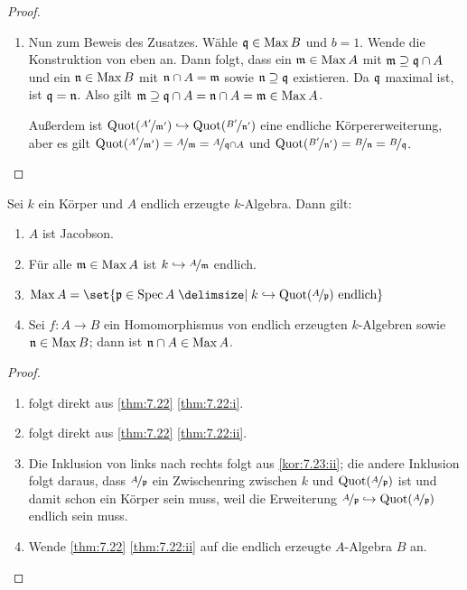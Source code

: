 \documentclass[12pt,a4paper]{scrartcl}
\theoremstyle{cplain}
\theoremstyle{cdef}
\begin{document}
\begin{proof}
\begin{enumerate}[label=\ref{thm:7.22:\roman*}]

		\item Nun zum Beweis des Zusatzes. Wähle $\mathfrak{q}\in\operatorname{Max} B$ und $b = 1$. Wende die Konstruktion von eben an. Dann folgt, dass ein $\mathfrak{m}\in\operatorname{Max} A$ mit $\mathfrak{m}\supseteq \mathfrak{q}\cap A$ und ein $\mathfrak{n}\in \operatorname{Max} B$ mit $\mathfrak{n}\cap A = \mathfrak{m}$ sowie $\mathfrak{n}\supseteq \mathfrak{q}$ existieren. Da $\mathfrak{q}$ maximal ist, ist $\mathfrak{q} = \mathfrak{n}$. Also gilt $\mathfrak{m}\supseteq \mathfrak{q}\cap A = \mathfrak{n}\cap A = \mathfrak{m}\in\operatorname{Max} A$. 

		Außerdem ist $\operatorname{Quot}(\nicefrac{A'}{\mathfrak{m}'})\hookrightarrow \operatorname{Quot}(\nicefrac{B'}{\mathfrak{n}'})$ eine endliche Körpererweiterung, aber es gilt $\operatorname{Quot}(\nicefrac{A'}{\mathfrak{m}'}) = \nicefrac{A}{\mathfrak{m}} = \nicefrac{A}{\mathfrak{q}\cap A}$ und $\operatorname{Quot}(\nicefrac{B'}{\mathfrak{n}'}) = \nicefrac{B}{\mathfrak{n}} = \nicefrac{B}{\mathfrak{q}}$.
		\qedhere
	\end{enumerate}
\end{proof}
\begin{kor} \label{kor:7.23}
	Sei $k$ ein Körper und $A$ endlich erzeugte $k$-Algebra. Dann gilt:
	\begin{enumerate}
		\item $A$ ist Jacobson. \label{kor:7.23:i}
		\item Für alle $\mathfrak{m}\in\operatorname{Max} A$ ist $k\hookrightarrow \nicefrac{A}{\mathfrak{m}}$ endlich. \label{kor:7.23:ii}
		\item $\Max A = \set{\fp\in\Spec A\given k\hookrightarrow \Quot(\fak A\fp) \text{ endlich}}$ \label{kor:7.23:iii}
		\item Sei $f\colon A \to B$ ein Homomorphismus von endlich erzeugten $k$-Algebren sowie $\mathfrak{n}\in\operatorname{Max} B$; dann ist $\mathfrak{n}\cap A \in\operatorname{Max} A$. \label{kor:7.23:iv}
	\end{enumerate}
\end{kor}
\begin{proof}
	\leavevmode
	\begin{enumerate}[label=\ref{kor:7.23:\roman*}]
		\item folgt direkt aus \cref{thm:7.22} \ref{thm:7.22:i}.
		\item folgt direkt aus \cref{thm:7.22} \ref{thm:7.22:ii}.
		\item Die Inklusion von links nach rechts folgt aus \ref{kor:7.23:ii}; die andere Inklusion folgt daraus, dass $\nicefrac{A}{\mathfrak{p}}$ ein Zwischenring zwischen $k$ und $\operatorname{Quot}(\nicefrac{A}{\mathfrak{p}})$ ist und damit schon ein Körper sein muss, weil die Erweiterung $\nicefrac{A}{\mathfrak{p}}\hookrightarrow \operatorname{Quot}(\nicefrac{A}{\mathfrak{p}})$ endlich sein muss.
		\item Wende \cref{thm:7.22} \ref{thm:7.22:ii} auf die endlich erzeugte $A$-Algebra $B$ an.
		\qedhere
	\end{enumerate}
\end{proof}
\end{document}
